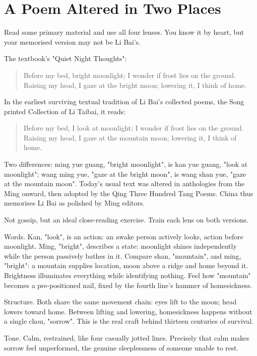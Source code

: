 \section{A Poem Altered in Two Places}
Read some primary material and use all four lenses. You know it by heart, but your memorised version may not be Li Bai's.

The textbook's "Quiet Night Thoughts":

\begin{quote}
Before my bed, bright moonlight; I wonder if frost lies on the ground. Raising my head, I gaze at the bright moon; lowering it, I think of home.
\end{quote}
In the earliest surviving textual tradition of Li Bai's collected poems, the Song printed Collection of Li Taibai, it reads:

\begin{quote}
Before my bed, I look at moonlight; I wonder if frost lies on the ground. Raising my head, I gaze at the mountain moon; lowering it, I think of home.
\end{quote}
Two differences: ming yue guang, "bright moonlight", is kan yue guang, "look at moonlight"; wang ming yue, "gaze at the bright moon", is wang shan yue, "gaze at the mountain moon". Today's usual text was altered in anthologies from the Ming onward, then adopted by the Qing Three Hundred Tang Poems. China thus memorises Li Bai as polished by Ming editors.

Not gossip, but an ideal close-reading exercise. Train each lens on both versions.

Words. Kan, "look", is an action: an awake person actively looks, action before moonlight. Ming, "bright", describes a state: moonlight shines independently while the person passively bathes in it. Compare shan, "mountain", and ming, "bright": a mountain supplies location, moon above a ridge and home beyond it. Brightness illuminates everything while identifying nothing. Feel how "mountain" becomes a pre-positioned nail, fixed by the fourth line's hammer of homesickness.

Structure. Both share the same movement chain: eyes lift to the moon; head lowers toward home. Between lifting and lowering, homesickness happens without a single chou, "sorrow". This is the real craft behind thirteen centuries of survival.

Tone. Calm, restrained, like four casually jotted lines. Precisely that calm makes sorrow feel unperformed, the genuine sleeplessness of someone unable to rest.

